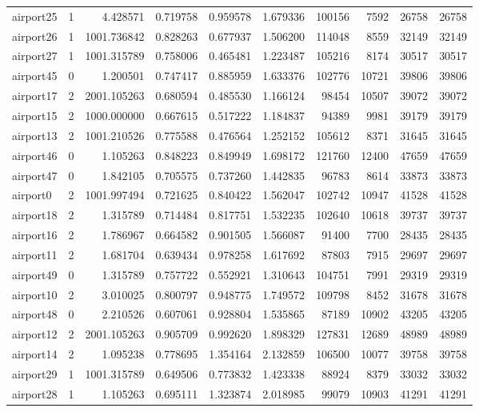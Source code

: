 \begin{longtable}{|l|r|r|r|r|r|r|r|r|r|}
airport25 & 1 & 4.428571 & 0.719758 & 0.959578 & 1.679336 & 100156 & 7592 & 26758 & 26758 \\
airport26 & 1 & 1001.736842 & 0.828263 & 0.677937 & 1.506200 & 114048 & 8559 & 32149 & 32149 \\
airport27 & 1 & 1001.315789 & 0.758006 & 0.465481 & 1.223487 & 105216 & 8174 & 30517 & 30517 \\
airport45 & 0 & 1.200501 & 0.747417 & 0.885959 & 1.633376 & 102776 & 10721 & 39806 & 39806 \\
airport17 & 2 & 2001.105263 & 0.680594 & 0.485530 & 1.166124 & 98454 & 10507 & 39072 & 39072 \\
airport15 & 2 & 1000.000000 & 0.667615 & 0.517222 & 1.184837 & 94389 & 9981 & 39179 & 39179 \\
airport13 & 2 & 1001.210526 & 0.775588 & 0.476564 & 1.252152 & 105612 & 8371 & 31645 & 31645 \\
airport46 & 0 & 1.105263 & 0.848223 & 0.849949 & 1.698172 & 121760 & 12400 & 47659 & 47659 \\
airport47 & 0 & 1.842105 & 0.705575 & 0.737260 & 1.442835 & 96783 & 8614 & 33873 & 33873 \\
airport0 & 2 & 1001.997494 & 0.721625 & 0.840422 & 1.562047 & 102742 & 10947 & 41528 & 41528 \\
airport18 & 2 & 1.315789 & 0.714484 & 0.817751 & 1.532235 & 102640 & 10618 & 39737 & 39737 \\
airport16 & 2 & 1.786967 & 0.664582 & 0.901505 & 1.566087 & 91400 & 7700 & 28435 & 28435 \\
airport11 & 2 & 1.681704 & 0.639434 & 0.978258 & 1.617692 & 87803 & 7915 & 29697 & 29697 \\
airport49 & 0 & 1.315789 & 0.757722 & 0.552921 & 1.310643 & 104751 & 7991 & 29319 & 29319 \\
airport10 & 2 & 3.010025 & 0.800797 & 0.948775 & 1.749572 & 109798 & 8452 & 31678 & 31678 \\
airport48 & 0 & 2.210526 & 0.607061 & 0.928804 & 1.535865 & 87189 & 10902 & 43205 & 43205 \\
airport12 & 2 & 2001.105263 & 0.905709 & 0.992620 & 1.898329 & 127831 & 12689 & 48989 & 48989 \\
airport14 & 2 & 1.095238 & 0.778695 & 1.354164 & 2.132859 & 106500 & 10077 & 39758 & 39758 \\
airport29 & 1 & 1001.315789 & 0.649506 & 0.773832 & 1.423338 & 88924 & 8379 & 33032 & 33032 \\
airport28 & 1 & 1.105263 & 0.695111 & 1.323874 & 2.018985 & 99079 & 10903 & 41291 & 41291 \\

\end{longtable}
